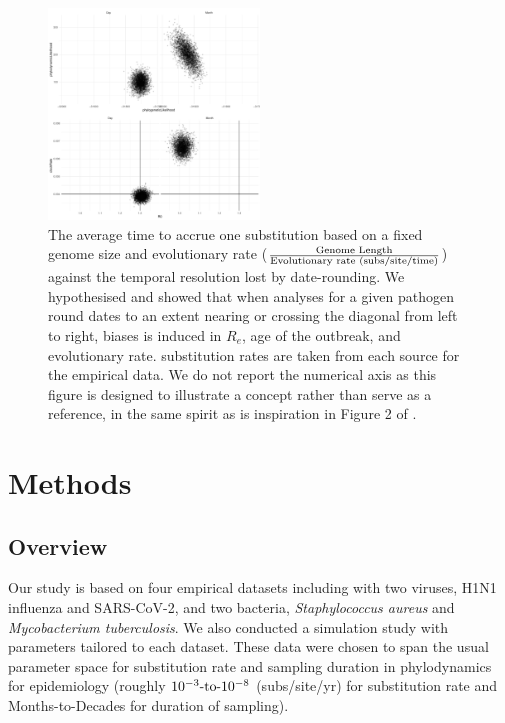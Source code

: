 \documentclass[12pt]{article}
\begin{document}
\begin{spacing}{2}
\begin{figure}[H]
    \centering
    \includegraphics[width = 0.5\textwidth]{plane.pdf}
    \caption{The average time to accrue one substitution based on a fixed genome size and evolutionary rate ($\frac{\textnormal{Genome Length}}{\textnormal{Evolutionary rate (subs/site/time)}}$) against the temporal resolution lost by date-rounding. We hypothesised and showed that when analyses for a given pathogen round dates to an extent nearing or crossing the diagonal from left to right, biases is induced in $R_e$, age of the outbreak, and evolutionary rate. substitution rates are taken from each source for the empirical data. We do not report the numerical axis as this figure is designed to illustrate a concept rather than serve as a reference, in the same spirit as is inspiration in Figure 2 of \citet{biek_measurably_2015}.}
    \label{fig:plane}
\end{figure}

\section*{Methods}
\subsection*{Overview}
Our study is based on four empirical datasets including with two viruses, H1N1 influenza and SARS-CoV-2, and two bacteria, \textit{Staphylococcus aureus} and \textit{Mycobacterium tuberculosis}. We also conducted a  simulation study with parameters tailored to each dataset. These data were chosen to span the usual parameter space for substitution rate and sampling duration in phylodynamics for epidemiology (roughly $10^{-3}\textnormal{-to-}10^{-8}$ (subs/site/yr) for substitution rate and Months-to-Decades for duration of sampling).


\end{spacing}
\end{document}
